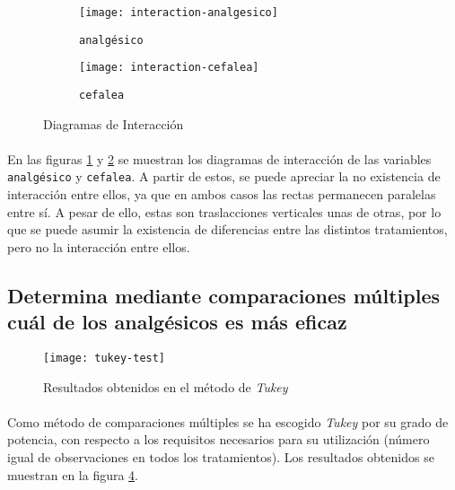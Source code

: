 \documentclass[11pt]{article}
\begin{document}
      \begin{figure}[!h]
        \centering
        \begin{subfigure}{.5\textwidth}
          \centering
          \texttt{[image: interaction-analgesico]}
          \caption{\texttt{analgésico}}
          \label{fig:interaction-analgesico}
        \end{subfigure}%
        \begin{subfigure}{.5\textwidth}
          \centering
          \texttt{[image: interaction-cefalea]}
          \caption{\texttt{cefalea}}
          \label{fig:interaction-cefalea}
        \end{subfigure}
        \caption{Diagramas de Interacción}
        \label{fig:interaction}
      \end{figure}

      \paragraph{}
      En las figuras \ref{fig:interaction-analgesico} y \ref{fig:interaction-cefalea} se muestran los diagramas de interacción de las variables \texttt{analgésico} y \texttt{cefalea}. A partir de estos, se puede apreciar la no existencia de interacción entre ellos, ya que en ambos casos las rectas permanecen paralelas entre sí. A pesar de ello, estas son traslacciones verticales unas de otras, por lo que se puede asumir la existencia de diferencias entre las distintos tratamientos, pero no la interacción entre ellos.

    \subsection{Determina mediante comparaciones múltiples cuál de los analgésicos es más eficaz}

      \begin{figure}[!h]
        \centering
        \texttt{[image: tukey-test]}
        \caption{Resultados obtenidos en el método de \emph{Tukey}}
        \label{fig:1f1b-anova-tukey-results}
      \end{figure}

      \paragraph{}
      Como método de comparaciones múltiples se ha escogido \emph{Tukey} por su grado de potencia, con respecto a los requisitos necesarios para su utilización (número igual de observaciones en todos los tratamientos). Los resultados obtenidos se muestran en la figura \ref{fig:1f1b-anova-tukey-results}.
\end{document}
